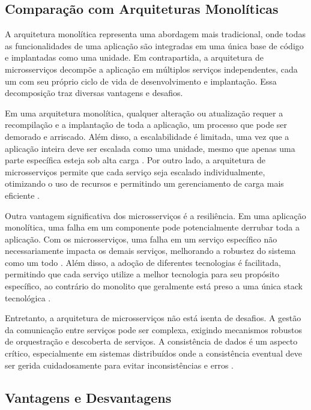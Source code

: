 \subsection{Comparação com Arquiteturas Monolíticas}

A arquitetura monolítica representa uma abordagem mais tradicional, onde todas as funcionalidades de uma aplicação são integradas em uma única base de código e implantadas como uma unidade. Em contrapartida, a arquitetura de microsserviços decompõe a aplicação em múltiplos serviços independentes, cada um com seu próprio ciclo de vida de desenvolvimento e implantação. Essa decomposição traz diversas vantagens e desafios.

Em uma arquitetura monolítica, qualquer alteração ou atualização requer a recompilação e a implantação de toda a aplicação, um processo que pode ser demorado e arriscado. Além disso, a escalabilidade é limitada, uma vez que a aplicação inteira deve ser escalada como uma unidade, mesmo que apenas uma parte específica esteja sob alta carga \cite{richardson2018}. Por outro lado, a arquitetura de microsserviços permite que cada serviço seja escalado individualmente, otimizando o uso de recursos e permitindo um gerenciamento de carga mais eficiente \cite{newman2019}.

Outra vantagem significativa dos microsserviços é a resiliência. Em uma aplicação monolítica, uma falha em um componente pode potencialmente derrubar toda a aplicação. Com os microsserviços, uma falha em um serviço específico não necessariamente impacta os demais serviços, melhorando a robustez do sistema como um todo \cite{dragoni2017}. Além disso, a adoção de diferentes tecnologias é facilitada, permitindo que cada serviço utilize a melhor tecnologia para seu propósito específico, ao contrário do monolito que geralmente está preso a uma única stack tecnológica \cite{fowler2014}.

Entretanto, a arquitetura de microsserviços não está isenta de desafios. A gestão da comunicação entre serviços pode ser complexa, exigindo mecanismos robustos de orquestração e descoberta de serviços. A consistência de dados é um aspecto crítico, especialmente em sistemas distribuídos onde a consistência eventual deve ser gerida cuidadosamente para evitar inconsistências e erros \cite{newman2019}.

\subsection{Vantagens e Desvantagens}

